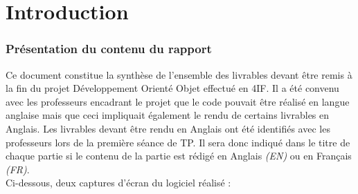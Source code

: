 \documentclass[paper=a4,fontsize=11pt]{report}
\numberwithin{equation}{section}		%
\numberwithin{figure}{section}		%
\numberwithin{table}{section}		%
\renewcommand{\it}[1]{\textit{#1}}
\begin{document}


\tableofcontents

\listoftodos

\newpage

\part{Introduction}
\label{part:introduction}
\setcounter{section}{0}

\section{Présentation du contenu du rapport}
\label{sec:presentation-du-contenu-du-rapport}

Ce document constitue la synthèse de l'ensemble des livrables devant être remis à la fin du projet Développement Orienté Objet effectué en 4IF. Il a été convenu avec les professeurs encadrant le projet que le code pouvait être réalisé en langue anglaise mais que ceci impliquait également le rendu de certains livrables en Anglais. Les livrables devant être rendu en Anglais ont été identifiés avec les professeurs lors de la première séance de TP. Il sera donc indiqué dans le titre de chaque partie si le contenu de la partie est rédigé en Anglais \it{(EN)} ou en Français \it{(FR)}.  \\

Ci-dessous, deux captures d'écran du logiciel réalisé :
\end{document}
